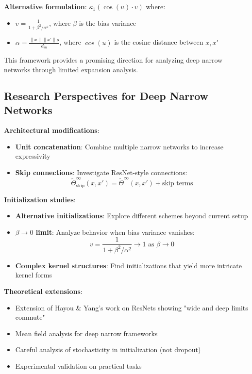 \documentclass[a4paper]{article}
\theoremstyle{plain}
\theoremstyle{definition}
\theoremstyle{remark}
\begin{document}
\textbf{Alternative formulation}: $\kappa_1(\cos(u) \cdot v)$ where:
\begin{itemize}
\item $v = \frac{1}{1 + \beta^2/\alpha^2}$, where $\beta$ is the bias variance
\item $\alpha = \frac{\|x\| \|x'\| \rho}{d_{in}}$, where $\cos(u)$ is the cosine distance between $x, x'$
\end{itemize}

This framework provides a promising direction for analyzing deep narrow networks through limited expansion analysis.

\subsection{Research Perspectives for Deep Narrow Networks}

\textbf{Architectural modifications}:
\begin{itemize}
\item \textbf{Unit concatenation}: Combine multiple narrow networks to increase expressivity
\item \textbf{Skip connections}: Investigate ResNet-style connections:
  \[ \tilde{\Theta}^\infty_{\text{skip}}(x, x') = \tilde{\Theta}^\infty(x, x') + \text{skip terms} \]
\end{itemize}

\textbf{Initialization studies}:
\begin{itemize}
\item \textbf{Alternative initializations}: Explore different schemes beyond current setup
\item \textbf{$\beta \to 0$ limit}: Analyze behavior when bias variance vanishes:
  \[ v = \frac{1}{1 + \beta^2/\alpha^2} \to 1 \text{ as } \beta \to 0 \]
\item \textbf{Complex kernel structures}: Find initializations that yield more intricate kernel forms
\end{itemize}

\begin{tcolorbox}[colback=green!5,colframe=green!80!black,title={\textbf{Remark: Theoretical Extensions}},enhanced,drop shadow,boxrule=2pt]
\textbf{Theoretical extensions}:
\begin{itemize}
\item Extension of Hayou \& Yang's work on ResNets showing "wide and deep limits commute"
\item Mean field analysis for deep narrow frameworks
\item Careful analysis of stochasticity in initialization (not dropout)
\item Experimental validation on practical tasks
\end{itemize}
\end{tcolorbox}

\newpage
\appendix
{}













\newpage
{}
\printbibliography
\end{document}
